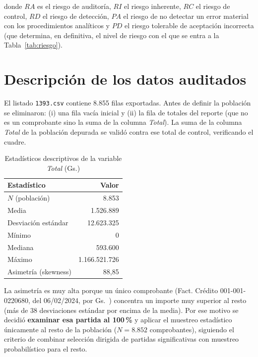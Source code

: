 \documentclass[12pt, a4paper]{article}
\newcommand{\Gs}[1]{Gs.\ \text{#1}}
\theoremstyle{plain}
\theoremstyle{definition}
\theoremstyle{remark}
\begin{document}
donde $RA$ es el riesgo de auditoría, $RI$ el riesgo inherente, $RC$ el
riesgo de control, $RD$ el riesgo de detección, $PA$ el riesgo de no
detectar un error material con los procedimientos analíticos y $PD$ el
riesgo tolerable de aceptación incorrecta (que determina, en definitiva, el
nivel de riesgo con el que se entra a la Tabla~\ref{tab:riesgo}).

\section{Descripción de los datos auditados}

El listado \texttt{1393.csv} contiene 8.855 filas exportadas. Antes de
definir la población se eliminaron: (i) una fila vacía inicial y (ii) la
fila de totales del reporte (que no es un comprobante sino la suma de la
columna \emph{Total}). La suma de la columna \emph{Total} de la población
depurada se validó contra ese total de control, verificando el cuadre.

\begin{table}[htbp]
    \centering
    \caption{Estadísticos descriptivos de la variable \emph{Total} (Gs.)}
    \label{tab:descriptivas}
    \begin{tabular}{@{}lr@{}}
        \toprule
        Estadístico & Valor \\
        \midrule
        $N$ (población) & 8.853 \\
        Media & 1.526.889 \\
        Desviación estándar & 12.623.325 \\
        Mínimo & 0 \\
        Mediana & 593.600 \\
        Máximo & 1.166.521.726 \\
        Asimetría (skewness) & 88{,}85 \\
        \bottomrule
    \end{tabular}
\end{table}

La asimetría es muy alta porque un único comprobante (Fact. Crédito
001-001-0220680, del 06/02/2024, por \Gs{1.166.521.726}) concentra un
importe muy superior al resto (más de 38 desviaciones estándar por encima
de la media). Por ese motivo se decidió \textbf{examinar esa partida al
100\,\%} y aplicar el muestreo estadístico únicamente al resto de la
población ($N = \text{8.852}$ comprobantes), siguiendo el criterio de combinar
selección dirigida de partidas significativas con muestreo probabilístico
para el resto.
\end{document}
